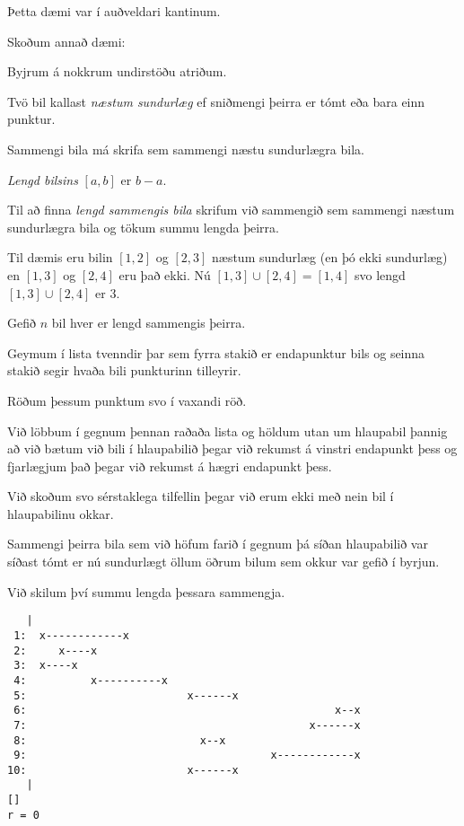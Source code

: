 {
	{
		\item<1-> Þetta dæmi var í auðveldari kantinum.
		\item<2-> Skoðum annað dæmi:
		\item<3-> Byjrum á nokkrum undirstöðu atriðum.
		\item<4-> Tvö bil kallast \emph{næstum sundurlæg} ef sniðmengi þeirra er tómt eða bara einn punktur.
		\item<5-> Sammengi bila má skrifa sem sammengi næstu sundurlægra bila.
		\item<6-> \emph{Lengd bilsins} $[a, b]$ er $b - a$.
		\item<7-> Til að finna \emph{lengd sammengis bila} skrifum við sammengið sem sammengi næstum sundurlægra bila
			og tökum summu lengda þeirra.
		\item<8-> Til dæmis eru bilin $[1, 2]$ og $[2, 3]$ næstum sundurlæg (en þó ekki sundurlæg) en 
			$[1, 3]$ og $[2, 4]$ eru það ekki. Nú $[1, 3] \cup [2, 4] = [1, 4]$ svo lengd 
			$[1, 3] \cup [2, 4]$ er $3$.
	}
}

{
	{
		\item<1-> Gefið $n$ bil hver er lengd sammengis þeirra.
	}
}

{
	{
		\item<1-> Geymum í lista tvenndir þar sem fyrra stakið er endapunktur bils og seinna stakið segir hvaða bili punkturinn tilleyrir.
		\item<2-> Röðum þessum punktum svo í vaxandi röð.
		\item<3-> Við löbbum í gegnum þennan raðaða lista og höldum utan um hlaupabil þannig að
			við bætum við bili í hlaupabilið þegar við rekumst á vinstri endapunkt þess og fjarlægjum það 
			þegar við rekumst á hægri endapunkt þess. 
		\item<4-> Við skoðum svo sérstaklega tilfellin þegar við erum ekki með nein bil í hlaupabilinu okkar.
		\item<5-> Sammengi þeirra bila sem við höfum farið í gegnum þá síðan hlaupabilið var síðast tómt er nú
			sundurlægt öllum öðrum bilum sem okkur var gefið í byrjun.
		\item<6-> Við skilum því summu lengda þessara sammengja.
	}
}

{ \begin{verbatim}
   |                                  
 1:  x------------x
 2:     x----x
 3:  x----x                    
 4:          x----------x
 5:                         x------x
 6:                                                x--x
 7:                                            x------x
 8:                           x--x
 9:                                      x------------x
10:                         x------x
   |                    
[]
r = 0
\end{verbatim} }

